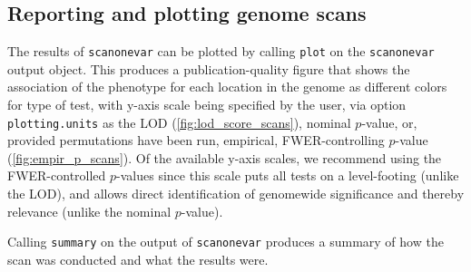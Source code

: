 \documentclass[9pt,twocolumn,twoside]{gsag3jnl}
\begin{document}
\subsection*{Reporting and plotting genome scans}

The results of \texttt{scanonevar} can be plotted by calling \texttt{plot} on the \texttt{scanonevar} output object. This produces a publication-quality figure that shows the association of the phenotype for each location in the genome as different colors for type of test, with y-axis scale being specified by the user, via option \texttt{plotting.units} as the LOD (\autoref{fig:lod_score_scans}), nominal $p$-value, or, provided permutations have been run, empirical, FWER-controlling $p$-value (\autoref{fig:empir_p_scans}). Of the available y-axis scales, we recommend using the FWER-controlled $p$-values since this scale puts all tests on a level-footing (unlike the LOD), and allows direct identification of genomewide significance and thereby relevance (unlike the nominal $p$-value).

Calling \texttt{summary} on the output of \texttt{scanonevar} produces a summary of how the scan was conducted and what the results were.




\end{document}
